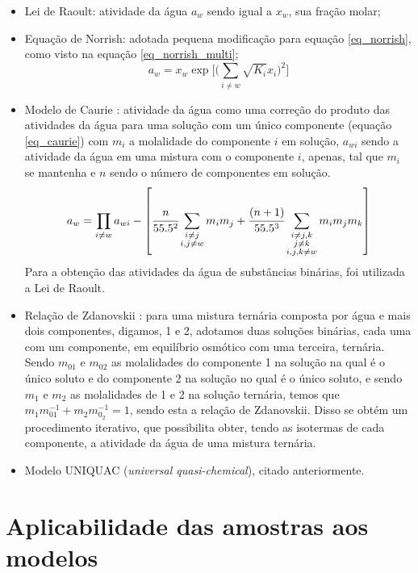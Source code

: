 \documentclass[
	12pt,				%
	openright,
	twoside,
	a4paper,			%
	brazil,			%
	french,				%
	spanish,			%
	english				%
	]{abntex2}
\begin{document}
\begin{itemize}
	\item Lei de Raoult: atividade da água $a_w$ sendo igual a $x_w$,
		sua fração molar;
	\item Equação de Norrish: adotada pequena modificação para equação
		\ref{eq_norrish}, como visto na equação \ref{eq_norrish_multi};
		\begin{equation}
			\label{eq_norrish_multi}
			a_w = x_w\exp\Big[\Big(\sum_{i \neq w}%
			\sqrt{K_i}x_i\Big)^2\Big]
		\end{equation}
	\item Modelo de Caurie \cite{caurie1986}: atividade da água como uma
		correção do produto das atividades da água para uma solução
		com um único componente (equação \ref{eq_caurie}) com
		$m_i$ a molalidade do componente $i$ em solução, $a_{wi}$
		sendo a atividade da água em uma mistura com o componente
		$i$, apenas, tal que $m_i$ se mantenha e $n$ sendo o número de
		componentes em solução.
		\begin{equation}
			\label{eq_caurie}
			a_w = \prod_{i \neq w}a_{wi}-\left[\cfrac{n}%
			{55.5^2}\sum_{\substack{i \neq j \\ i,j \neq w}}%
			m_im_j + \cfrac{(n+1)}{55.5^3}\sum_{%
			\substack{i\neq j,k \\ j \neq k \\  i,j,k \neq w}}%
			m_im_jm_k\right]
		\end{equation}
		Para a obtenção das atividades da água de substâncias
		binárias, foi utilizada a Lei de Raoult.
	\item Relação de Zdanovskii \cite{chen1973,sangster1973}:
		para uma mistura ternária composta por água e mais dois
		componentes, digamos, 1 e 2, adotamos duas soluções binárias,
		cada uma com um componente, em equilíbrio osmótico com uma
		terceira, ternária. Sendo $m_{01}$ e $m_{02}$ as
		molalidades do componente 1 na solução na qual é o único
		soluto e do componente 2 na solução no qual é o único soluto, e
		sendo $m_1$ e $m_2$ as molalidades de 1 e 2 na solução ternária,
		temos que $m_1m_{01}^{-1} + m_2m_{0_2}^{-1} = 1$, sendo esta a
		relação de Zdanovskii. Disso se obtém um procedimento iterativo,
		que possibilita obter, tendo as isotermas de cada componente, a
		atividade da água de uma mistura ternária.
	\item Modelo UNIQUAC (\textit{universal quasi-chemical}), citado
		anteriormente.
\end{itemize}

\section{Aplicabilidade das amostras aos modelos}
\end{document}
